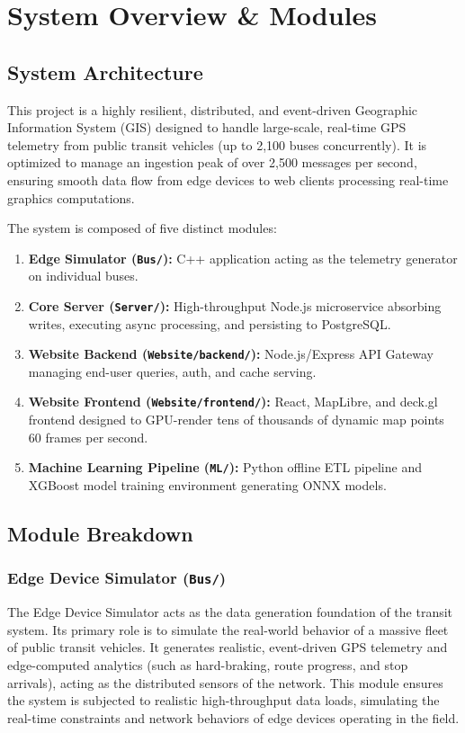\documentclass[a4paper]{article}
\begin{document}
\section{System Overview \& Modules}
\subsection{System Architecture}
This project is a highly resilient, distributed, and event-driven Geographic Information System (GIS) designed to handle large-scale, real-time GPS telemetry from public transit vehicles (up to 2,100 buses concurrently). It is optimized to manage an ingestion peak of over 2,500 messages per second, ensuring smooth data flow from edge devices to web clients processing real-time graphics computations.

The system is composed of five distinct modules:
\begin{enumerate}
    \item \textbf{Edge Simulator (\texttt{Bus/}):} C++ application acting as the telemetry generator on individual buses.
    \item \textbf{Core Server (\texttt{Server/}):} High-throughput Node.js microservice absorbing writes, executing async processing, and persisting to PostgreSQL.
    \item \textbf{Website Backend (\texttt{Website/backend/}):} Node.js/Express API Gateway managing end-user queries, auth, and cache serving.
    \item \textbf{Website Frontend (\texttt{Website/frontend/}):} React, MapLibre, and deck.gl frontend designed to GPU-render tens of thousands of dynamic map points 60 frames per second.
    \item \textbf{Machine Learning Pipeline (\texttt{ML/}):} Python offline ETL pipeline and XGBoost model training environment generating ONNX models.
\end{enumerate}

\subsection{Module Breakdown}

\subsubsection{Edge Device Simulator (\texttt{Bus/})}
The Edge Device Simulator acts as the data generation foundation of the transit system. Its primary role is to simulate the real-world behavior of a massive fleet of public transit vehicles. It generates realistic, event-driven GPS telemetry and edge-computed analytics (such as hard-braking, route progress, and stop arrivals), acting as the distributed sensors of the network. This module ensures the system is subjected to realistic high-throughput data loads, simulating the real-time constraints and network behaviors of edge devices operating in the field.
\end{document}
